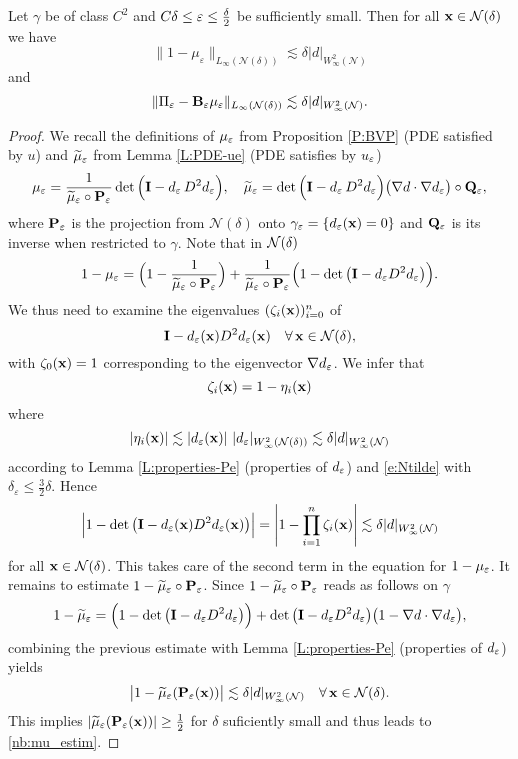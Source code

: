 %
\begin{lemma}\label{e:narrow:consistency_alg}
Let $\gamma$ be of class $C^2$ and $C\delta \le \varepsilon\le\frac{\delta}{2}$ be sufficiently small. Then for all ${\bf x}\in{\mathcal{N}(\delta)}$ we have
%
\begin{equation}\label{nb:mu_estim}
\|1-\mu_\varepsilon\|_{L_\infty(\mathcal N(\delta))} \lesssim   \delta |d|_{W^2_\infty(\mathcal{N})}
\end{equation}
and
\begin{equation}\label{nb:matrix_estim}
\|  \Pi_{\varepsilon} - {\bf B}_\varepsilon \mu_\varepsilon \|_{L_\infty(\mathcal N(\delta))} \lesssim    \delta |d|_{W^2_\infty(\mathcal{N})}.
\end{equation}
\end{lemma}
\begin{proof}
We recall the definitions of ${\mu_{\varepsilon}}$ from Proposition \ref{P:BVP} (PDE satisfied by $u$)
and ${\widetilde{\mu}_{\varepsilon}}$ from Lemma \ref{L:PDE-ue} (PDE satisfies by $u_\varepsilon$)
\[
{\mu_{\varepsilon}} = \frac{1}{{\widetilde{\mu}_{\varepsilon}}\circ{{\bf P}_\varepsilon}} \det\Big( {\bf I} - d_\varepsilon \, D^2d_\varepsilon  \Big), \quad 
{\widetilde{\mu}_{\ensuremath{\varepsilon}}} = \det\Big({\bf I} - d_\varepsilon \, D^2d_\varepsilon  \Big)
\big( \nabla d \cdot \nabla d_\varepsilon  \big) \circ{\mathbf{Q}_{\ensuremath{\varepsilon}}},
\]
where ${\bf P}_{\varepsilon}$ is the projection from $\mathcal N(\delta)$ onto $\gamma_{\varepsilon} =\{ d_\varepsilon ({\bf x}) = 0\}$ and ${\bf Q}_{\varepsilon}$ is its inverse when restricted to $\gamma$. 
%
Note that in ${\mathcal{N}(\delta)}$
%
\[
1-{\mu_{\varepsilon}} = \Big(1 - \frac{1}{{\widetilde{\mu}_{\varepsilon}}\circ{{\bf P}_\varepsilon}}  \Big)
+ \frac{1}{{\widetilde{\mu}_{\varepsilon}}\circ{{\bf P}_\varepsilon}} \Big(1 - \det \big({\bf I} - d_\varepsilon D^2 d_\varepsilon \big) \Big).
\]
%
We thus need to examine the eigenvalues $(\zeta_i({\bf x}))_{i=0}^n$ of 
$$
{\bf I} - d_\varepsilon({\bf x})D^2 d_\varepsilon({\bf x}) \quad\forall \, {\bf x}\in{\mathcal{N}(\delta)},
$$
with $\zeta_0({\bf x})=1$ corresponding to the eigenvector $\nabla d_\varepsilon$.
We infer that
$$
\zeta_i({\bf x}) = 1 - \eta_i({\bf x})
$$
where 
\begin{equation*}\label{e:narrow:zeta}
  | \eta_i({\bf x})| \lesssim  | d_\varepsilon({\bf x})| ~ | d_\varepsilon |_{W^2_\infty({\mathcal{N}(\delta)})} \lesssim
  \delta | d |_{W^2_\infty({\mathcal N})}
\end{equation*}
%
according to Lemma \ref{L:properties-Pe} (properties of $d_\varepsilon$) and \eqref{e:Ntilde}
with $\delta_\varepsilon \le \frac32 \delta$. Hence
%
\begin{equation*}\label{e:narrow:estimr}
\Big| 1 - \det \big( {\bf I} - d_\varepsilon({\bf x})D^2 d_\varepsilon({\bf x}) \big) \Big|
= \left| 1- \prod_{i=1}^{n} \zeta_i({\bf x})\right|
\lesssim \delta |d|_{W^2_\infty({\mathcal N})}
\end{equation*}
%
for all ${\bf x}\in{\mathcal{N}(\delta)}$. This takes care of the second term in the equation for $1-{\mu_{\varepsilon}}$.
It remains to estimate $1-{\widetilde{\mu}_{\varepsilon}}\circ{{\bf P}_\varepsilon}$. Since $1-{\widetilde{\mu}_{\varepsilon}}\circ{{\bf P}_\varepsilon}$ reads as follows
on $\gamma$
%
\[
1-{\widetilde{\mu}_{\varepsilon}} = \Big(1 - \det \big( {\bf I} - d_\varepsilon D^2 d_\varepsilon \big) \Big)
+ \det \big( {\bf I} - d_\varepsilon D^2 d_\varepsilon \big) \big(1 - \nabla d\cdot\nabla d_\varepsilon \big),
\]
%
combining the previous estimate with Lemma \ref{L:properties-Pe} (properties
of $d_\varepsilon$) yields
%
\[
\big| 1-{\widetilde{\mu}_{\varepsilon}}({{\bf P}_\varepsilon}({\bf x})) \big| \lesssim \delta  |d|_{W^2_\infty({\mathcal N})}
\quad\forall \, {\bf x}\in{\mathcal{N}(\delta)}.
\]
%
This implies $|{\widetilde{\mu}_{\varepsilon}}({{\bf P}_\varepsilon}({\bf x}))|\ge\frac12$ for $\delta$ suficiently small and
thus leads to \eqref{nb:mu_estim}.
%


\end{proof}
